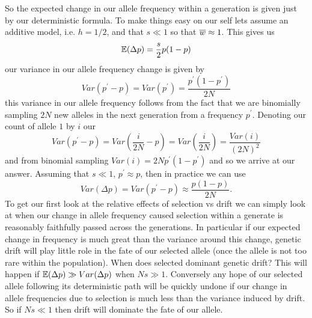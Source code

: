 So the expected change in our allele frequency within a generation is given just by our
deterministic formula. To make things easy on our self lets assume an
additive model, i.e. $h=1/2$, and that $s \ll 1$ so that $\overline{w}
\approx 1$. This gives us
\begin{equation}
\mathbb{E}(\Delta p ) = \frac{s}{2} p(1-p) \label{eqn:WF_mean}
\end{equation}
our variance in our allele frequency change is given by
\begin{equation}
Var(p^{\prime} - p) = Var(p^{\prime}) = \frac{p^{\prime}(1-p^{\prime})}{2N}
\end{equation}
this variance in our allele frequency follows from the fact that we
are binomially sampling $2N$ new alleles in the next
generation from a frequency $p^{\prime}$. Denoting our count of allele $1$ by $i$ our
\begin{equation}
Var(p^{\prime} - p) = Var(\frac{i}{2N} - p) =  Var(\frac{i}{2N} ) =\frac{Var(i)}{(2N)^2}
\end{equation}
and from binomial sampling $Var(i) = 2N p^{\prime}(1-p^{\prime})$ and
so we arrive at our answer. Assuming that $s \ll 1$, $p^{\prime}
\approx p$, then in practice we can use
\begin{equation}
Var(\Delta p)  =Var(p^{\prime} - p) \approx \frac{p(1-p)}{2N}. \label{eqn:WF_var}
\end{equation}
To get our first look at the relative effects of selection vs drift we
can simply look at when our change in allele frequency caused
selection within a generate is reasonably faithfully passed across
the generations. In particular if our expected change in frequency is much
great than the variance around this change, genetic drift will play
little role in the fate of our selected allele (once the allele is not
too rare within the population). When does selected
dominant genetic drift? This will happen if $\mathbb{E}(\Delta p) \gg Var(\Delta p)$ when $Ns \gg 1$. Conversely any
hope of our selected allele following its deterministic path will be quickly undone if our change in allele frequencies due to selection is
much less than the variance induced by drift. So if $Ns \ll 1$ then
drift will dominate the fate of our allele. \\


